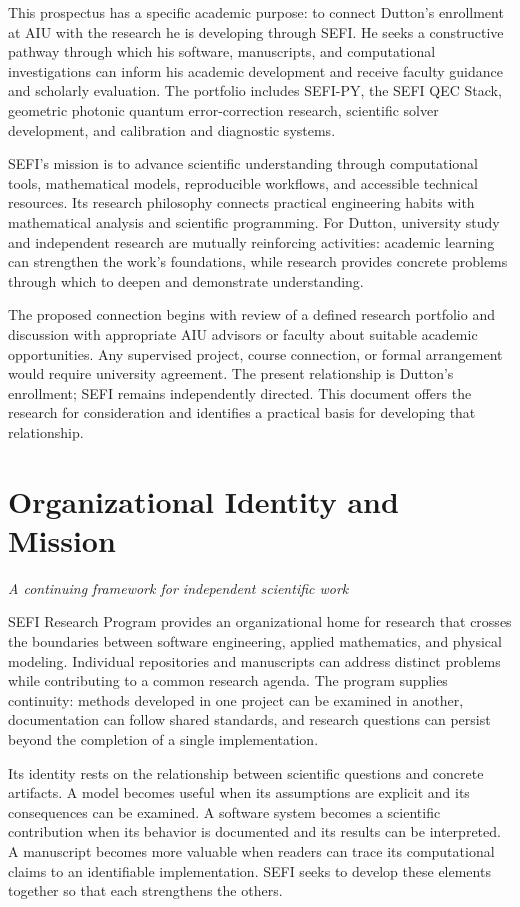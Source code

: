 \documentclass[10pt,letterpaper]{article}
\newcommand{\pageheading}[2]{\clearpage\section{#1}\textit{#2}\par\medskip}
\begin{document}
This prospectus has a specific academic purpose: to connect Dutton's enrollment at AIU with the research he is developing through SEFI. He seeks a constructive pathway through which his software, manuscripts, and computational investigations can inform his academic development and receive faculty guidance and scholarly evaluation. The portfolio includes SEFI-PY, the SEFI QEC Stack, geometric photonic quantum error-correction research, scientific solver development, and calibration and diagnostic systems.

SEFI's mission is to advance scientific understanding through computational tools, mathematical models, reproducible workflows, and accessible technical resources. Its research philosophy connects practical engineering habits with mathematical analysis and scientific programming. For Dutton, university study and independent research are mutually reinforcing activities: academic learning can strengthen the work's foundations, while research provides concrete problems through which to deepen and demonstrate understanding.

The proposed connection begins with review of a defined research portfolio and discussion with appropriate AIU advisors or faculty about suitable academic opportunities. Any supervised project, course connection, or formal arrangement would require university agreement. The present relationship is Dutton's enrollment; SEFI remains independently directed. This document offers the research for consideration and identifies a practical basis for developing that relationship.

\pageheading{Organizational Identity and Mission}{A continuing framework for independent scientific work}
SEFI Research Program provides an organizational home for research that crosses the boundaries between software engineering, applied mathematics, and physical modeling. Individual repositories and manuscripts can address distinct problems while contributing to a common research agenda. The program supplies continuity: methods developed in one project can be examined in another, documentation can follow shared standards, and research questions can persist beyond the completion of a single implementation.

Its identity rests on the relationship between scientific questions and concrete artifacts. A model becomes useful when its assumptions are explicit and its consequences can be examined. A software system becomes a scientific contribution when its behavior is documented and its results can be interpreted. A manuscript becomes more valuable when readers can trace its computational claims to an identifiable implementation. SEFI seeks to develop these elements together so that each strengthens the others.
\end{document}

